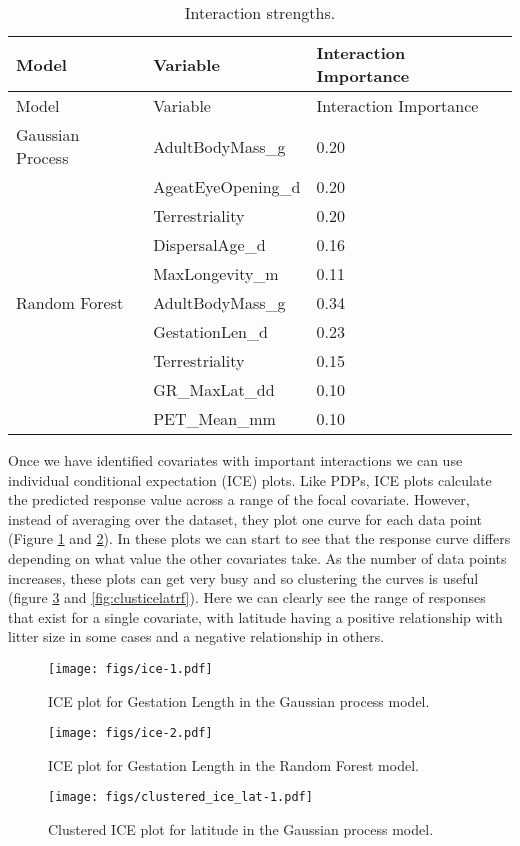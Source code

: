 \documentclass[10pt,]{article}
\begin{document}
\begin{longtable}[c]{@{}lll@{}}
\caption{Interaction strengths. \label{tbl:interimp}}\tabularnewline
\toprule
Model & Variable & Interaction Importance\tabularnewline
\midrule
\endfirsthead
\toprule
Model & Variable & Interaction Importance\tabularnewline
\midrule
\endhead
Gaussian Process & AdultBodyMass\_g & 0.20\tabularnewline
& AgeatEyeOpening\_d & 0.20\tabularnewline
& Terrestriality & 0.20\tabularnewline
& DispersalAge\_d & 0.16\tabularnewline
& MaxLongevity\_m & 0.11\tabularnewline
Random Forest & AdultBodyMass\_g & 0.34\tabularnewline
& GestationLen\_d & 0.23\tabularnewline
& Terrestriality & 0.15\tabularnewline
& GR\_MaxLat\_dd & 0.10\tabularnewline
& PET\_Mean\_mm & 0.10\tabularnewline
\bottomrule
\end{longtable}

Once we have identified covariates with important interactions we can use individual conditional expectation (ICE) plots. Like PDPs, ICE plots calculate the predicted response value across a range of the focal covariate. However, instead of averaging over the dataset, they plot one curve for each data point (Figure \ref{fig:icegestgp} and \ref{fig:icegestrf}). In these plots we can start to see that the response curve differs depending on what value the other covariates take. As the number of data points increases, these plots can get very busy and so clustering the curves is useful (figure \ref{fig:clusticelatgp} and \ref{fig:clusticelatrf}). Here we can clearly see the range of responses that exist for a single covariate, with latitude having a positive relationship with litter size in some cases and a negative relationship in others.

\begin{figure}[htbp]
\centering
\texttt{[image: figs/ice-1.pdf]}
\caption{ICE plot for Gestation Length in the Gaussian process model.\protect\label{fig:icegestgp}}
\end{figure}

\begin{figure}[htbp]
\centering
\texttt{[image: figs/ice-2.pdf]}
\caption{ICE plot for Gestation Length in the Random Forest model.\protect\label{fig:icegestrf}}
\end{figure}

\begin{figure}[htbp]
\centering
\texttt{[image: figs/clustered\_ice\_lat-1.pdf]}
\caption{Clustered ICE plot for latitude in the Gaussian process model.\protect\label{fig:clusticelatgp}}
\end{figure}
\end{document}
